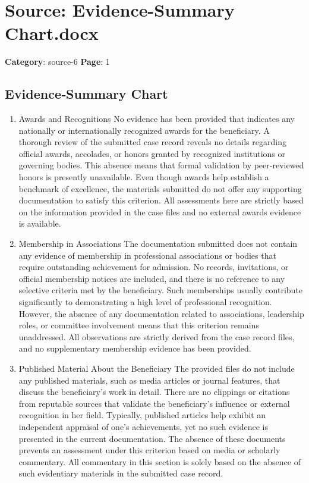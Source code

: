 \section*{Source: Evidence-Summary Chart.docx}
\textbf{Category}: source-6
\textbf{Page}: 1

\subsection*{Evidence‑Summary Chart}

\begin{enumerate}

\item Awards and Recognitions
No evidence has been provided that indicates any nationally or internationally recognized awards for the beneficiary. A thorough review of the submitted case record reveals no details regarding official awards, accolades, or honors granted by recognized institutions or governing bodies. This absence means that formal validation by peer-reviewed honors is presently unavailable. Even though awards help establish a benchmark of excellence, the materials submitted do not offer any supporting documentation to satisfy this criterion. All assessments here are strictly based on the information provided in the case files and no external awards evidence is available.

\item Membership in Associations
The documentation submitted does not contain any evidence of membership in professional associations or bodies that require outstanding achievement for admission. No records, invitations, or official membership notices are included, and there is no reference to any selective criteria met by the beneficiary. Such memberships usually contribute significantly to demonstrating a high level of professional recognition. However, the absence of any documentation related to associations, leadership roles, or committee involvement means that this criterion remains unaddressed. All observations are strictly derived from the case record files, and no supplementary membership evidence has been provided.

\item Published Material About the Beneficiary
The provided files do not include any published materials, such as media articles or journal features, that discuss the beneficiary’s work in detail. There are no clippings or citations from reputable sources that validate the beneficiary’s influence or external recognition in her field. Typically, published articles help exhibit an independent appraisal of one’s achievements, yet no such evidence is presented in the current documentation. The absence of these documents prevents an assessment under this criterion based on media or scholarly commentary. All commentary in this section is solely based on the absence of such evidentiary materials in the submitted case record.


\end{enumerate}
